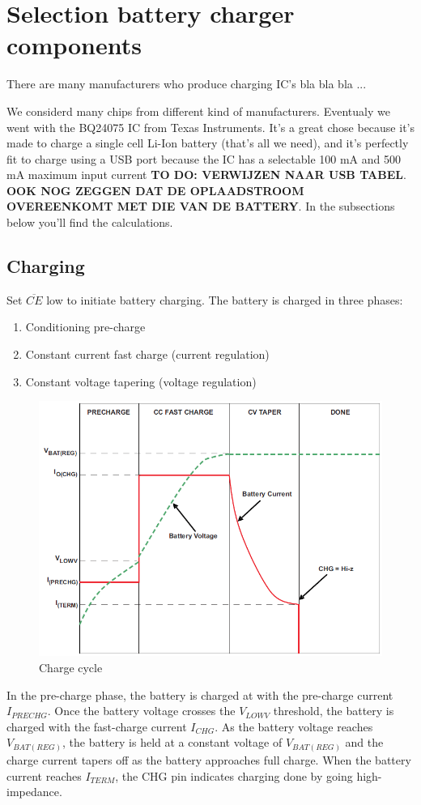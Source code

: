 \documentclass[11pt,a4paper]{article}
\begin{document}
\section{Selection battery charger components}
There are many manufacturers who produce charging IC's  bla bla bla ...

We considerd many chips from different kind of manufacturers. Eventualy we went with the BQ24075 IC from Texas Instruments. It's a great chose because it's made to charge a single cell Li-Ion battery (that's all we need), and it's perfectly fit to charge using a USB port because the IC has a selectable 100 mA and 500 mA maximum input current \textbf{TO DO: VERWIJZEN NAAR USB TABEL}. \textbf{OOK NOG ZEGGEN DAT DE OPLAADSTROOM OVEREENKOMT MET DIE VAN DE BATTERY}. In the subsections below you'll find the calculations.

\subsection{Charging}
Set $\overline{CE}$ low to initiate battery charging. The battery is charged in three phases: 
\begin{enumerate}
	\item Conditioning pre-charge
	\item Constant current fast charge (current regulation) 
	\item Constant voltage tapering (voltage regulation)
\end{enumerate}
\begin{figure}[!ht]
	\centering
	\includegraphics[width=1.0\linewidth]{Charge_cycle}
	\caption{Charge cycle}
	\label{fig:Charge _cycle}
\end{figure}
In the pre-charge phase, the battery is charged at with the pre-charge current $I_{PRECHG}$. Once the battery voltage crosses the $V_{LOWV}$ threshold, the battery is charged with the fast-charge current $I_{CHG}$. As the battery voltage reaches $V_{BAT(REG)}$, the battery is held at a constant voltage of $V_{BAT(REG)}$ and the charge current tapers off as the battery approaches full charge. When the battery current reaches $I_{TERM}$, the CHG pin indicates charging done by going high-impedance.
\end{document}
